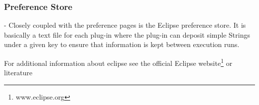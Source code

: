 \subsubsection{Preference Store}
\label{section:TechPreferenceStore}
- Closely coupled with the preference pages is the Eclipse preference store. It is
basically a text file for each plug-in where the plug-in can deposit simple Strings
under a given key to ensure that information is kept between execution runs.

For additional information about eclipse see the official Eclipse website\footnote{www.eclipse.org} or literature \cite{eclipsePlugins}